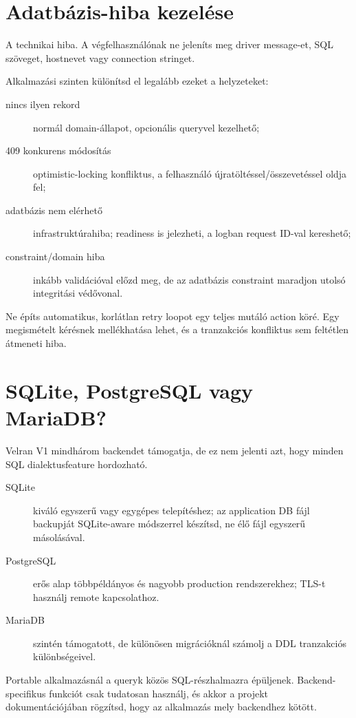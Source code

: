 \section{Adatbázis-hiba kezelése}

A  technikai hiba. A végfelhasználónak ne jeleníts meg driver message-et, SQL szöveget, hostnevet vagy connection stringet.

Alkalmazási szinten különítsd el legalább ezeket a helyzeteket:

\begin{description}
\item[nincs ilyen rekord] normál domain-állapot, opcionális queryvel kezelhető;
\item[409 konkurens módosítás] optimistic-locking konfliktus, a felhasználó újratöltéssel/összevetéssel oldja fel;
\item[adatbázis nem elérhető] infrastruktúrahiba; readiness is jelezheti, a logban request ID-val kereshető;
\item[constraint/domain hiba] inkább validációval előzd meg, de az adatbázis constraint maradjon utolsó integritási védővonal.
\end{description}

Ne építs automatikus, korlátlan retry loopot egy teljes mutáló action köré. Egy megismételt kérésnek mellékhatása lehet, és a tranzakciós konfliktus sem feltétlen átmeneti hiba.

\section{SQLite, PostgreSQL vagy MariaDB?}

Velran V1 mindhárom backendet támogatja, de ez nem jelenti azt, hogy minden SQL dialektusfeature hordozható.

\begin{description}
\item[SQLite] kiváló egyszerű vagy egygépes telepítéshez; az application DB fájl backupját SQLite-aware módszerrel készítsd, ne élő fájl egyszerű másolásával.
\item[PostgreSQL] erős alap többpéldányos és nagyobb production rendszerekhez; TLS-t használj remote kapcsolathoz.
\item[MariaDB] szintén támogatott, de különösen migrációknál számolj a DDL tranzakciós különbségeivel.
\end{description}

Portable alkalmazásnál a queryk közös SQL-részhalmazra épüljenek. Backend-specifikus funkciót csak tudatosan használj, és akkor a projekt dokumentációjában rögzítsd, hogy az alkalmazás mely backendhez kötött.

